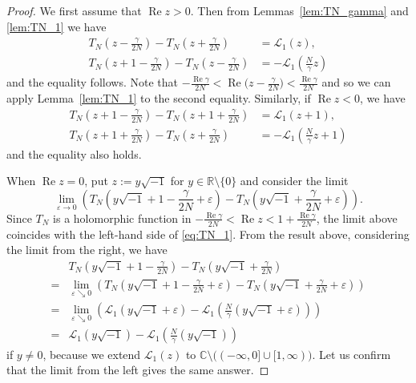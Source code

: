 \documentclass[a4paper,dvipdfmx]{amsart}
\theoremstyle{plain}
\theoremstyle{definition}
\theoremstyle{remark}
\newcommand{\C}{\mathbb{C}}
\newcommand{\R}{\mathbb{R}}
\renewcommand{\L}{\mathcal{L}}
\renewcommand{\Re}{\operatorname{Re}}
\renewcommand{\i}{\sqrt{-1}}
\numberwithin{equation}{section}
\begin{document}
\begin{proof}
We first assume that $\Re{z}>0$.
Then from Lemmas~\ref{lem:TN_gamma} and \ref{lem:TN_1} we have
\begin{align*}
  T_{N}\left(z-\frac{\gamma}{2N}\right)-T_{N}\left(z+\frac{\gamma}{2N}\right)
  &=
  \L_1(z),
  \\
  T_{N}\left(z+1-\frac{\gamma}{2N}\right)-T_{N}\left(z-\frac{\gamma}{2N}\right)
  &=
  -\L_1\left(\frac{N}{\gamma}z\right)
\end{align*}
and the equality follows.
Note that $-\frac{\Re\gamma}{2N}<\Re\bigl(z-\frac{\gamma}{2N}\bigr)<\frac{\Re\gamma}{2N}$ and so we can apply Lemma~\ref{lem:TN_1} to the second equality.
Similarly, if $\Re{z}<0$, we have
\begin{align*}
  T_{N}\left(z+1-\frac{\gamma}{2N}\right)-T_{N}\left(z+1+\frac{\gamma}{2N}\right)
  &=
  \L_1(z+1),
  \\
  T_{N}\left(z+1+\frac{\gamma}{2N}\right)-T_{N}\left(z+\frac{\gamma}{2N}\right)
  &=
  -\L_1\left(\frac{N}{\gamma}z+1\right)
\end{align*}
and the equality also holds.
\par
When $\Re{z}=0$, put $z:=y\i$ for $y\in\R\setminus\{0\}$ and consider the limit
\begin{equation*}
  \lim_{\varepsilon\to0}
  \left(
    T_{N}\left(y\i+1-\frac{\gamma}{2N}+\varepsilon\right)
    -
    T_{N}\left(y\i+\frac{\gamma}{2N}+\varepsilon\right)
  \right).
\end{equation*}
Since $T_{N}$ is a holomorphic function in $-\frac{\Re\gamma}{2N}<\Re{z}<1+\frac{\Re\gamma}{2N}$, the limit above coincides with the left-hand side of \eqref{eq:TN_1}.
From the result above, considering the limit from the right, we have
\begin{align*}
  &T_{N}\left(y\i+1-\frac{\gamma}{2N}\right)
  -
  T_{N}\left(y\i+\frac{\gamma}{2N}\right)
  \\
  =&
  \lim_{\varepsilon\searrow0}
  \left(
    T_{N}\left(y\i+1-\frac{\gamma}{2N}+\varepsilon\right)
    -
    T_{N}\left(y\i+\frac{\gamma}{2N}+\varepsilon\right)
  \right)
  \\
  =&
  \lim_{\varepsilon\searrow0}
  \left(
    \L_1(y\i+\varepsilon)-\L_1\left(\frac{N}{\gamma}(y\i+\varepsilon)\right)
  \right)
  \\
  =&
  \L_1(y\i)-\L_1\left(\frac{N}{\gamma}(y\i)\right)
\end{align*}
if $y\ne0$, because we extend $\L_1(z)$ to $\C\setminus\bigl((-\infty,0]\cup[1,\infty)\bigr)$.
Let us confirm that the limit from the left gives the same answer.

\end{proof}
\end{document}
